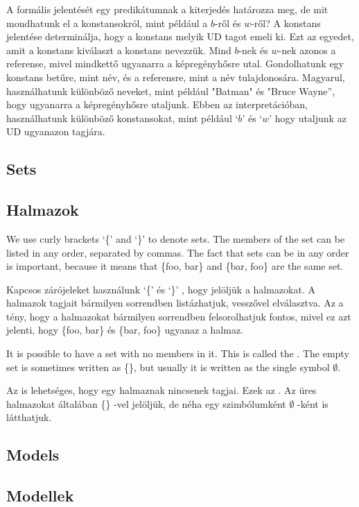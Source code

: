A formális jelentését egy predikátumnak a kiterjedés határozza meg, de mit mondhatunk el a konstansokról, mint például a $b$-ről és $w$-ről? A konstans jelentése determinálja, hogy a konstans melyik UD tagot emeli ki. Ezt az egyedet, amit a konstans kiválaszt a konstans  nevezzük. Mind $b$-nek és $w$-nek azonos a referense, mivel mindkettő ugyanarra a képregényhősre utal. Gondolhatunk egy konstans betűre, mint név, és a referensre, mint a név tulajdonosára. Magyarul, használhatunk különböző neveket, mint például "Batman" és "Bruce Wayne”, hogy ugyanarra a képregényhősre utaljunk. Ebben az interpretációban, használhatunk különböző konstansokat, mint például `$b$' és `$w$' hogy utaljunk az UD ugyanazon tagjára.

\subsection*{Sets}
\subsection{Halmazok}

We use curly brackets `\{' and `\}' to denote sets. The members of the set can be listed in any order, separated by commas. The fact that sets can be in any order is important, because it means that \{foo, bar\} and \{bar, foo\} are the same set.

Kapcsos zárójeleket használunk `\{' és `\}' , hogy jelöljük a halmazokat. A halmazok tagjait bármilyen sorrendben listázhatjuk, vesszővel elválasztva. Az a tény, hogy a halmazokat bármilyen sorrendben felsorolhatjuk fontos, mivel ez azt jelenti, hogy \{foo, bar\} és \{bar, foo\} ugyanaz a halmaz.

It is possible to have a set with no members in it. This is called the . The empty set is sometimes written as \{\}, but usually it is written as the single symbol $\emptyset$.

Az is lehetséges, hogy egy halmaznak nincsenek tagjai. Ezek az . Az üres halmazokat általában \{\} -vel jelöljük, de néha egy szimbólumként $\emptyset$ -ként is látthatjuk.

\subsection*{Models}
\subsection{Modellek}

